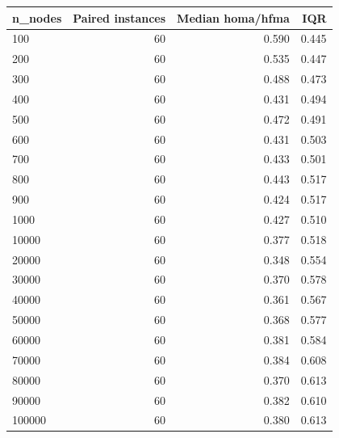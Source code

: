 \begin{tabular}{lrrr}
\toprule
n\_nodes & Paired instances & Median homa/hfma & IQR \\
\midrule
100 & 60 & 0.590 & 0.445 \\
200 & 60 & 0.535 & 0.447 \\
300 & 60 & 0.488 & 0.473 \\
400 & 60 & 0.431 & 0.494 \\
500 & 60 & 0.472 & 0.491 \\
600 & 60 & 0.431 & 0.503 \\
700 & 60 & 0.433 & 0.501 \\
800 & 60 & 0.443 & 0.517 \\
900 & 60 & 0.424 & 0.517 \\
1000 & 60 & 0.427 & 0.510 \\
10000 & 60 & 0.377 & 0.518 \\
20000 & 60 & 0.348 & 0.554 \\
30000 & 60 & 0.370 & 0.578 \\
40000 & 60 & 0.361 & 0.567 \\
50000 & 60 & 0.368 & 0.577 \\
60000 & 60 & 0.381 & 0.584 \\
70000 & 60 & 0.384 & 0.608 \\
80000 & 60 & 0.370 & 0.613 \\
90000 & 60 & 0.382 & 0.610 \\
100000 & 60 & 0.380 & 0.613 \\
\bottomrule
\end{tabular}
